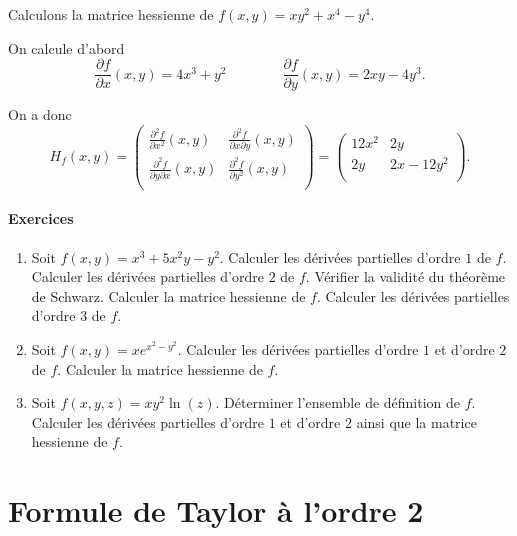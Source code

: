 \begin{exemple}
Calculons la matrice hessienne de $f(x,y) = xy^2 + x^4 - y^4$.

On calcule d'abord 
$$\frac{\partial f}{\partial x}(x,y) = 4x^3 + y^2
\qquad\qquad
\frac{\partial f}{\partial y}(x,y) = 2xy - 4y^3.$$

On a donc 
$$H_f(x,y)
= \begin{pmatrix}
    \frac{\partial ^2f}{\partial x^2}(x,y) & \frac{\partial ^2f}{\partial x\partial y}(x,y) \\
    \frac{\partial ^2f}{\partial y\partial x}(x,y) & \frac{\partial ^2f}{\partial y^2}(x,y) \\
\end{pmatrix}
= 
\begin{pmatrix}
12x^2 & 2y \\
2y      & 2x - 12y^2 \\
\end{pmatrix}.$$
\end{exemple}


\paragraph{Exercices}
    \begin{enumerate}
        \item Soit $f(x,y) = x^3+5x^2y-y^2$. Calculer les dérivées partielles d'ordre $1$ de $f$. Calculer les dérivées partielles d'ordre $2$ de $f$. Vérifier la validité du théorème de Schwarz. Calculer la matrice hessienne de $f$. Calculer les dérivées partielles d'ordre $3$ de $f$.
        
        \item Soit $f(x,y) = xe^{x^2-y^2}$. Calculer les dérivées partielles d'ordre $1$ et d'ordre $2$ de $f$. Calculer la matrice hessienne de $f$.
        
        \item Soit $f(x,y,z) = xy^2 \ln(z)$. Déterminer l'ensemble de définition de $f$. Calculer les dérivées partielles d'ordre $1$ et d'ordre $2$ ainsi que la matrice hessienne de $f$.                
    \end{enumerate}


\section{Formule de Taylor à l'ordre 2}


